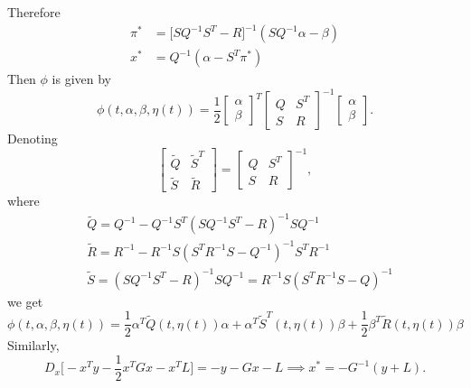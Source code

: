 Therefore
\begin{align*}
    \pi^\ast &= \big[ S Q^{-1}S^T - R \big]^{-1}(S Q^{-1} \alpha - \beta)\\
    x^\ast &= Q^{-1} (\alpha - S^T \pi^\ast)
\end{align*}
Then $\phi$ is given by
\begin{equation*}
    \phi(t, \alpha, \beta,\eta(t)) = 
    \frac12
    \begin{bmatrix}
        \alpha\\
        \beta
    \end{bmatrix}^T
    \begin{bmatrix}
        Q & S^T\\
        S & R
    \end{bmatrix}^{-1}
    \begin{bmatrix}
        \alpha\\
        \beta
    \end{bmatrix}. 
\end{equation*}
Denoting
\begin{equation*}\begin{bmatrix}
        \tilde{Q} & \tilde{S}^T\\
        \tilde{S} & \tilde{R}
    \end{bmatrix}
    =
    \begin{bmatrix}
        Q & S^T\\
        S & R
    \end{bmatrix}^{-1},
\end{equation*}
where
\begin{align}
    &\tilde{Q} = Q^{-1} - Q^{-1} S^T (S Q^{-1} S^T - R)^{-1}S Q^{-1} \label{eq: markov_tilde_q}\\
    &\tilde{R} = R^{-1} - R^{-1} S (S^T R^{-1}S - Q^{-1})^{-1}S^T R^{-1} \label{eq: markov_tilde_r}\\
    &\tilde{S} = (S Q^{-1} S^T - R)^{-1}S Q^{-1} = R^{-1}S(S^TR^{-1}S - Q)^{-1} \label{eq: markov_tilde_s}
\end{align}
we get
\begin{equation}
    \phi(t, \alpha, \beta, \eta(t)) = \frac12 \alpha^T \tilde{Q}(t, \eta(t)) \alpha + \alpha^T \tilde{S}^T(t,\eta(t)) \beta + \frac12 \beta^T \tilde{R}(t, \eta(t)) \beta \label{eq: markov_phi}
\end{equation}
Similarly, 
\begin{equation*}
    D_x \big[-x^T y - \frac12 x^T G x - x^T L \big] = -y - Gx - L \implies x^\ast = - G^{-1} (y + L).
\end{equation*}
